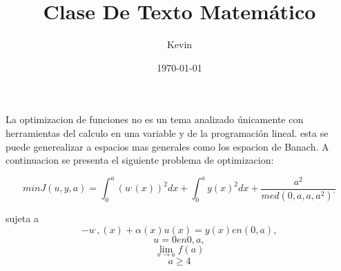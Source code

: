 \documentclass[a5paper, 12pt]{article}
\author{Kevin}
\title{Clase De Texto Matemático}
\date{\today}
\begin{document}
\maketitle
 La optimizacion de funciones no es un tema analizado únicamente con herramientas del calculo en una variable y de la programación lineal. esta se puede generealizar a espacios mas generales como los espacion de Banach. A continuacion se presenta el siguiente problema de optimizacion:
 
 \[
 minJ(u,y,a)=\int_{0}^{a} (u^,(x))^2 dx +  \int_{0}^{a} y(x)^2dx + \dfrac{a^2}{med(0,a,a,a^2)^,}
\]

sujeta a
\[-u^,,(x) + \alpha(x)u(x)=y(x) en (0,a),\]
\[u=0 en{0,a},\]
\[\displaystyle\lim_{x\to a} f(a)\]
\[a\geq4\]
\end{document}
